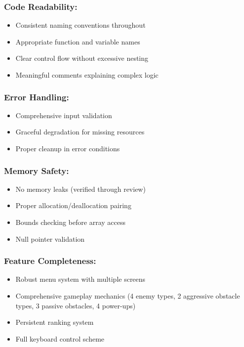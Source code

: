 \documentclass[12pt,a4paper]{article}
\begin{document}
\subsubsection*{Code Readability:}
\begin{itemize}
    \item Consistent naming conventions throughout
    \item Appropriate function and variable names
    \item Clear control flow without excessive nesting
    \item Meaningful comments explaining complex logic
\end{itemize}

\subsubsection*{Error Handling:}
\begin{itemize}
    \item Comprehensive input validation
    \item Graceful degradation for missing resources
    \item Proper cleanup in error conditions
\end{itemize}

\subsubsection*{Memory Safety:}
\begin{itemize}
    \item No memory leaks (verified through review)
    \item Proper allocation/deallocation pairing
    \item Bounds checking before array access
    \item Null pointer validation
\end{itemize}

\subsubsection*{Feature Completeness:}
\begin{itemize}
    \item Robust menu system with multiple screens
    \item Comprehensive gameplay mechanics (4 enemy types, 2 aggressive obstacle types, 3 passive obstacles, 4 power-ups)
    \item Persistent ranking system
    \item Full keyboard control scheme
\end{itemize}
\end{document}
